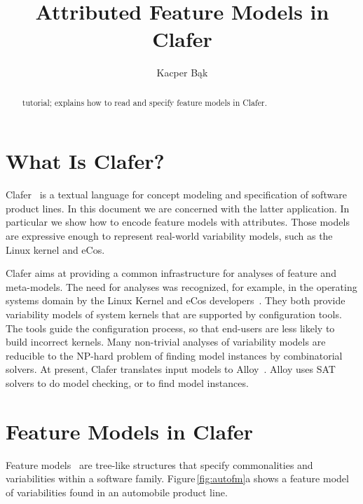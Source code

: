 \documentclass{llncs}
\newcommand{\Figref}[1]{Figure\,\ref{fig:#1}}
\begin{document}
\title{Attributed Feature Models in Clafer}

\author{Kacper B\k{a}k}


\maketitle

\begin{abstract}
tutorial; explains how to read and specify feature models in Clafer.
\end{abstract}

\section{What Is Clafer?}
Clafer~\cite{bak:clafer:2010} is a textual language for concept modeling and specification of software product lines. In this document we are concerned with the latter application. In particular we show how to encode feature models with attributes. Those models are expressive enough to represent real-world variability models, such as the Linux kernel and eCos.

Clafer aims at providing a common infrastructure for analyses of feature and meta-models. The need for analyses was recognized, for example, in the operating systems domain by the Linux Kernel and eCos developers~\cite{berger:varmodel:2010}. They both provide variability models of system kernels that are supported by configuration tools. The tools guide the configuration process, so that end-users are less likely to build incorrect kernels. Many non-trivial analyses of variability models are reducible to the NP-hard problem of finding model instances by combinatorial solvers. At present, Clafer translates input models to Alloy~\cite{jackson:alloy:2006}. Alloy uses SAT solvers to do model checking, or to find model instances. 

\section{Feature Models in Clafer}

Feature models~\cite{kang:foda:1990} are tree-like structures that specify commonalities and variabilities within a software family. \Figref{autofm}a shows a feature model of variabilities found in an automobile product line.
\end{document}
